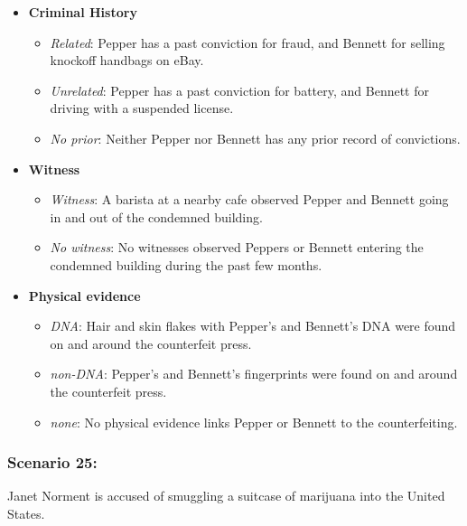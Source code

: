 \documentclass[
]{article}
\providecommand{\tightlist}{%
  \setlength{\itemsep}{0pt}\setlength{\parskip}{0pt}}
\begin{document}
\begin{itemize}
\tightlist
\item
  \textbf{Criminal History}

  \begin{itemize}
  \tightlist
  \item
    \emph{Related}: Pepper has a past conviction for fraud, and Bennett
    for selling knockoff handbags on eBay.
  \item
    \emph{Unrelated}: Pepper has a past conviction for battery, and
    Bennett for driving with a suspended license.
  \item
    \emph{No prior}: Neither Pepper nor Bennett has any prior record of
    convictions.
  \end{itemize}
\item
  \textbf{Witness}

  \begin{itemize}
  \tightlist
  \item
    \emph{Witness}: A barista at a nearby cafe observed Pepper and
    Bennett going in and out of the condemned building.
  \item
    \emph{No witness}: No witnesses observed Peppers or Bennett entering
    the condemned building during the past few months.
  \end{itemize}
\item
  \textbf{Physical evidence}

  \begin{itemize}
  \tightlist
  \item
    \emph{DNA}: Hair and skin flakes with Pepper's and Bennett's DNA
    were found on and around the counterfeit press.
  \item
    \emph{non-DNA}: Pepper's and Bennett's fingerprints were found on
    and around the counterfeit press.
  \item
    \emph{none}: No physical evidence links Pepper or Bennett to the
    counterfeiting.
  \end{itemize}
\end{itemize}

\hypertarget{scenario-25}{%
\subsubsection{Scenario 25:}\label{scenario-25}}

Janet Norment is accused of smuggling a suitcase of marijuana into the
United States.
\end{document}
